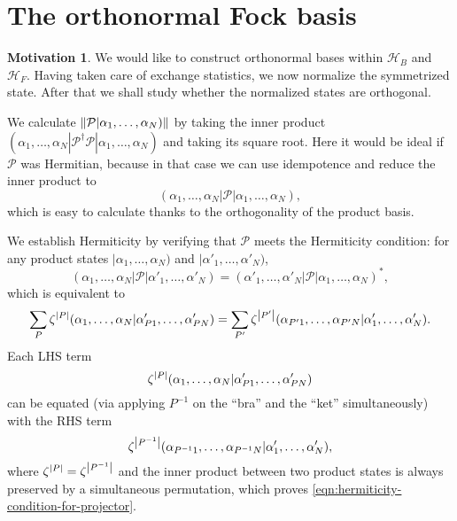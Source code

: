 \documentclass{article}
\theoremstyle{definition}
\newtheorem{mot}{Motivation}[section]
\theoremstyle{plain}
\numberwithin{equation}{section}
\begin{document}
\section{The orthonormal Fock basis}
\begin{mot}
    We would like to construct orthonormal bases within 
    $\mathcal{H}_{B}$ and $\mathcal{H}_{F}$. 
    Having taken care of exchange statistics, we now 
    normalize the symmetrized state. After that 
    we shall study whether the normalized states are orthogonal. 
\end{mot}

    We calculate $\norm{\mathcal{P}|\alpha_1, \ldots ,\alpha_{N})}$ 
    by taking the inner product 
    $(\alpha_1, \ldots ,\alpha_{N}|\mathcal{P}^{\dagger}\mathcal{P}|\alpha_1, \ldots ,\alpha_{N})$ and taking its square root. 
    Here it would be ideal if $\mathcal{P}$ was 
    Hermitian, because in that case we can use 
    idempotence and reduce the inner product to 
    \[
    (\alpha_1, \ldots ,\alpha_{N}|\mathcal{P}|\alpha_1, \ldots ,\alpha_{N}),
    \]
    which is easy to calculate thanks to the 
    orthogonality of the product basis.
    
    We establish Hermiticity by verifying that $\mathcal{P}$ meets 
    the Hermiticity condition: for any product states 
    $|\alpha_{1}, \ldots ,\alpha_{N})$ and 
    $|\alpha'_{1}, \ldots ,\alpha'_{N})$,
    \begin{equation}
        (\alpha_1, \ldots ,\alpha_{N}|\mathcal{P}|
        \alpha'_{1}, \ldots ,\alpha'_{N})
        =
        (\alpha'_1, \ldots ,\alpha'_{N}|\mathcal{P}|
        \alpha_{1}, \ldots ,\alpha_{N})^{*},
    \label{eqn:hermiticity-condition-for-projector}
    \end{equation}
    which is equivalent to 
    \[
        \sum_{P}\zeta^{\abs{P}}
        (\alpha_1, \ldots ,\alpha_{N}|
        \alpha'_{P1}, \ldots ,\alpha'_{PN})
        =
        \sum_{P'}\zeta^{\abs{P'}}
        (\alpha_{P'1}, \ldots ,\alpha_{P'N}|
        \alpha'_{1}, \ldots ,\alpha'_{N}).
    \]
    Each LHS term 
    \[
        \zeta^{\abs{P}}
    (\alpha_1, \ldots ,\alpha_{N}|
    \alpha'_{P1}, \ldots ,\alpha'_{PN})
    \]
    can be equated (via applying $P ^{-1}$ on 
    the ``bra'' and the ``ket'' simultaneously) with the RHS term 
    \[
        \zeta^{\abs{P ^{-1}}}
    (\alpha_{P ^{-1} 1}, \ldots ,\alpha_{P ^{-1} N}|
    \alpha'_{1}, \ldots ,\alpha'_{N}),
    \]
    where $\zeta^{\abs{P}}=\zeta^{\abs{P^{-1}}}$ and 
    the inner product between 
    two product states is always preserved 
    by a simultaneous permutation, 
    which proves \cref{eqn:hermiticity-condition-for-projector}.
\end{document}
